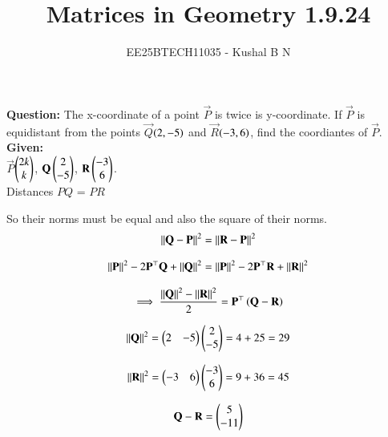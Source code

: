 \documentclass[journal,12pt,onecolumn]{IEEEtran}
\title{Matrices in Geometry 1.9.24}
\author{EE25BTECH11035 - Kushal B N}
\theoremstyle{remark}
\begin{document}
\vspace{3cm}
\maketitle
{\let\newpage\relax\maketitle}
\textbf{Question: }
The x-coordinate of a point $\vec{P}$ is twice is y-coordinate. If $\vec{P}$ is equidistant from the points $\vec{Q}$$\left(2,-5\right)$ and $\vec{R}$$\left(-3,6\right)$, find the coordiantes of $\vec{P}$.\\

\textbf{Given: } \\
$\vec{P}$$\begin{pmatrix}2k\\k\end{pmatrix}$, $\mathbf{Q}\begin{pmatrix}2\\-5\end{pmatrix}$, $\mathbf{R}\begin{pmatrix}-3\\6\end{pmatrix}$.\\
Distances $PQ$ = $PR$

So their norms must be equal and also the square of their norms.
\begin{equation}
	{\left\lVert\mathbf{Q}-\mathbf{P}\right\rVert}^{2} = {\left\lVert\mathbf{R}-\mathbf{P}\right\rVert}^{2}
\end{equation}

\begin{equation}
    {\left\lVert\mathbf{P}\right\rVert}^2 - 2\mathbf{P}^{\top}\mathbf{Q} + {\left\lVert\mathbf{Q}\right\rVert}^2 = {\left\lVert\mathbf{P}\right\rVert}^2 - 2\mathbf{P}^{\top}\mathbf{R} + {\left\lVert\mathbf{R}\right\rVert}^2
\end{equation}

\begin{equation}
    \implies \frac{{\left\lVert\mathbf{Q}\right\rVert}^2 - {\left\lVert\mathbf{R}\right\rVert}^2}{2} = \mathbf{P}^{\top}\left(\mathbf{Q}-\mathbf{R}\right)
\end{equation}

\begin{equation}
    {\left\lVert\mathbf{Q}\right\rVert}^2 = \begin{pmatrix}2&-5\end{pmatrix}\begin{pmatrix}2\\-5\end{pmatrix} = 4+25 = 29
\end{equation}

\begin{equation}
    {\left\lVert\mathbf{R}\right\rVert}^2 = \begin{pmatrix}-3&6\end{pmatrix}\begin{pmatrix}-3\\6\end{pmatrix} = 9+36 = 45
\end{equation}

\begin{equation}
    \mathbf{Q} - \mathbf{R} = \begin{pmatrix}5\\-11\end{pmatrix}
\end{equation}
\end{document}
